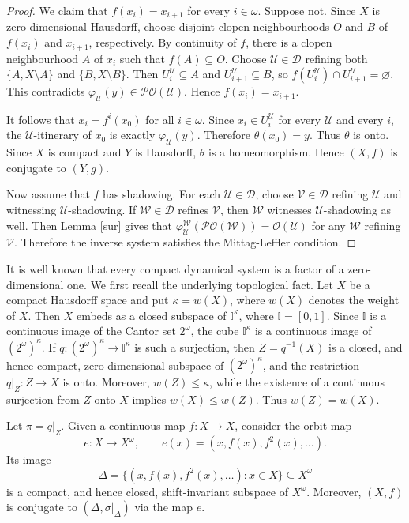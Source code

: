 \documentclass[12pt]{amsart}
\theoremstyle{definition}
\numberwithin{equation}{section}
\theoremstyle{remark}
\def\U{{\mathcal{U}}}
\def\U{{\mathcal{U}}}
\begin{document}
\begin{proof}
We claim that $f(x_i)=x_{i+1}$ for every $i\in\omega$. Suppose not. Since $X$
is zero-dimensional Hausdorff, choose disjoint clopen neighbourhoods $O$ and
$B$ of $f(x_i)$ and $x_{i+1}$, respectively. By continuity of $f$, there is a
clopen neighbourhood $A$ of $x_i$ such that $f(A)\subseteq O$. Choose
$\mathcal U\in\mathcal D$ refining both $\{A,X\setminus A\}$ and
$\{B,X\setminus B\}$. Then $U_i^{\mathcal U}\subseteq A$ and
$U_{i+1}^{\mathcal U}\subseteq B$, so
$f(U_i^{\mathcal U})\cap U_{i+1}^{\mathcal U}=\varnothing$. This contradicts
$\varphi_{\mathcal U}(y)\in\mathcal{PO}(\mathcal U)$. Hence
$f(x_i)=x_{i+1}$.

It follows that $x_i=f^i(x_0)$ for all $i\in\omega$. Since
$x_i\in U_i^{\mathcal U}$ for every $\mathcal U$ and every $i$, the
$\mathcal U$-itinerary of $x_0$ is exactly $\varphi_{\mathcal U}(y)$. Therefore
$\theta(x_0)=y$. Thus $\theta$ is onto. Since $X$ is compact and $Y$ is
Hausdorff, $\theta$ is a homeomorphism. Hence $(X,f)$ is conjugate to
$(Y,g)$.

Now assume that $f$ has shadowing. For each $\mathcal U\in\mathcal D$, choose
$\mathcal V\in\mathcal D$ refining $\mathcal U$ and witnessing
$\mathcal U$-shadowing.
If $\mathcal W\in\mathcal D$ refines $\mathcal V$, then $\mathcal W$ witnesses $\mathcal U$-shadowing as well.
Then Lemma \ref{sur} gives that
$\varphi_{\mathcal U}^{\mathcal W}(\mathcal{PO}(\mathcal W))
=
\mathcal{O}(\U)$ for any $\mathcal W$ refining $\mathcal V$. Therefore the inverse system
satisfies the Mittag-Leffler condition.
\end{proof}



It is well known that every compact dynamical system is a factor of a
zero-dimensional one. We first recall the underlying topological fact. Let
$X$ be a compact Hausdorff space and put $\kappa=w(X)$, where $w(X)$ denotes the weight of $X$. Then $X$ embeds as a
closed subspace of $\mathbb I^\kappa$, where $\mathbb I=[0,1]$. Since
$\mathbb I$ is a continuous image of the Cantor set $2^\omega$, the cube
$\mathbb I^\kappa$ is a continuous image of $(2^\omega)^\kappa$. If
$q:(2^\omega)^\kappa\to\mathbb I^\kappa$ is such a surjection, then
$
Z=q^{-1}(X)
$
is a closed, and hence compact, zero-dimensional subspace of
$(2^\omega)^\kappa$, and the restriction $q|_Z:Z\to X$ is onto. Moreover,
$w(Z)\leq\kappa$, while the existence of a continuous surjection from $Z$ onto
$X$ implies $w(X)\leq w(Z)$. Thus $w(Z)=w(X)$.


Let $\pi = q|_Z$. Given a continuous map
$f:X\to X$, consider the orbit map
\[
    e:X\to X^\omega,\qquad e(x)=(x,f(x),f^2(x),\ldots).
\]
Its image
\[
    \Delta=\{(x,f(x),f^2(x),\ldots):x\in X\}\subseteq X^\omega
\]
is a compact, and hence closed, shift-invariant subspace of $X^\omega$. Moreover,
$(X,f)$ is conjugate to $(\Delta,\sigma|_\Delta)$ via the map $e$.
\end{document}
